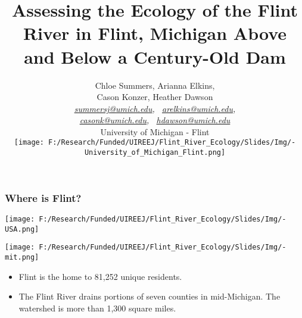 \documentclass[10pt]{beamer}
\title[Flint River Ecology]{
    Assessing the Ecology of the Flint River in Flint, Michigan Above and Below a Century-Old Dam
}
\author{Chloe Summers, Arianna Elkins, \\ Cason Konzer, Heather Dawson  \\ \vspace{2.5mm}
       \textit{ \color{violet}
       \href{mailto:summersj@umich.edu}{summersj@umich.edu}, \ \href{mailto:arelkins@umich.edu}{arelkins@umich.edu}, \\ \href{mailto:casonk@umich.edu}{casonk@umich.edu}, \ \href{mailto:hdawson@umich.edu}{hdawson@umich.edu}
       } \\ \vspace{2.5mm}
       University of Michigan - Flint \\ \vspace{2.5mm}
       \texttt{[image: F:/Research/Funded/UIREEJ/Flint\_River\_Ecology/Slides/Img/-University\_of\_Michigan\_Flint.png]}
}
\date[]{}
\newcommand{\iast}{\item[$\circledast$]}
\begin{document}

\begin{frame}
    \titlepage
\end{frame}






\begin{frame}
    \frametitle{Where is Flint?} %
    \begin{minipage}{0.63\textwidth}
        \begin{center}
          \texttt{[image: F:/Research/Funded/UIREEJ/Flint\_River\_Ecology/Slides/Img/-USA.png]}
        \end{center}
    \end{minipage} %
      \begin{minipage}{0.34\textwidth}
        \begin{center}
          \texttt{[image: F:/Research/Funded/UIREEJ/Flint\_River\_Ecology/Slides/Img/-mit.png]}
        \end{center}
    \end{minipage} %
    \vspace{5mm}
    \begin{itemize}
      \iast Flint is the home to 81,252 unique residents. %
      \iast The Flint River drains portions of seven counties in mid-Michigan. The watershed is more than 1,300 square miles. 
    \end{itemize}
\end{frame}
\end{document}
